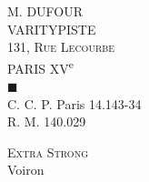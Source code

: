 M. DUFOUR\\
VARITYPISTE\\
131, \textsc{Rue Lecourbe}\\
PARIS XV\textsuperscript{e}\\
$\blacksquare$\\
C. C. P. Paris 14.143-34\\
R. M. 140.029

\textsc{Extra Strong}\\
 Voiron
